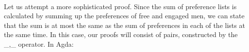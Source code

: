 {\begin{code}
\>[0]%
\>[1497I]\AgdaSymbol{(}\AgdaSpace{}%
\AgdaOperator{\AgdaInductiveConstructor{,}}\AgdaSpace{}%
\AgdaInductiveConstructor{[]}\AgdaSymbol{)}\<%
\\
\>[.][@{}l@{}]\<[1497I]%
\>[20]\AgdaSymbol{((}\AgdaSpace{}%
\AgdaOperator{\AgdaInductiveConstructor{,}}\AgdaSpace{}%
\AgdaSpace{}%
\AgdaSpace{}%
\AgdaSymbol{)}\AgdaSpace{}%
\AgdaSpace{}%
\AgdaSymbol{)}\<%
\\
%
\>[20]\AgdaSpace{}%
\AgdaSymbol{=}\AgdaSpace{}%
\AgdaSpace{}%
\AgdaSpace{}%
\AgdaSymbol{(}\AgdaSpace{}%
\AgdaSymbol{(}\AgdaSpace{}%
\AgdaSymbol{((}\AgdaSpace{}%
\AgdaOperator{\AgdaInductiveConstructor{,}}\AgdaSpace{}%
\AgdaSymbol{)}\AgdaSpace{}%
\AgdaSpace{}%
\AgdaSymbol{)))}\<%
\\
\>[0]%
\>[1516I]\AgdaSymbol{(}\AgdaSpace{}%
\AgdaOperator{\AgdaInductiveConstructor{,}}\AgdaSpace{}%
\AgdaSpace{}%
\AgdaSpace{}%
\AgdaSymbol{)}\<%
\\
\>[.][@{}l@{}]\<[1516I]%
\>[20]\AgdaSymbol{((}\AgdaSpace{}%
\AgdaOperator{\AgdaInductiveConstructor{,}}\AgdaSpace{}%
\AgdaSpace{}%
\AgdaSpace{}%
\AgdaSymbol{)}\AgdaSpace{}%
\AgdaSpace{}%
\AgdaSymbol{)}\<%
\\
%
\>[20]\AgdaSpace{}%
\AgdaSymbol{=}\AgdaSpace{}%
\AgdaSpace{}%
\AgdaSymbol{(}\AgdaSpace{}%
\AgdaSymbol{(}\AgdaSpace{}%
\AgdaSpace{}%
\AgdaOperator{\AgdaPrimitive{+}}\AgdaSpace{}%
\AgdaSpace{}%
\AgdaSymbol{))}\AgdaSpace{}%
\AgdaSpace{}%
\AgdaSymbol{(}\AgdaSpace{}%
\AgdaSymbol{)}\<%
\\
\>[0]\<%
\end{code}

Let us attempt a more sophisticated proof. Since the sum of preference lists is calculated by summing up the preferences of free and engaged men, we can state that the sum is at most the same as the sum of preferences in each of the lists at the same time. In this case, our proofs will consist of pairs, constructed by the _,_ operator. In Agda:

}
